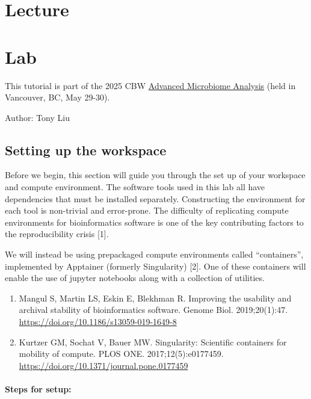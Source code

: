 \documentclass[
]{book}
\providecommand{\tightlist}{%
  \setlength{\itemsep}{0pt}\setlength{\parskip}{0pt}}
\begin{document}
\section{Lecture}\label{lecture-2}

\section{Lab}\label{lab-1}

This tutorial is part of the 2025 CBW \href{https://bioinformaticsdotca.github.io/AMB_2025/}{Advanced Microbiome Analysis} (held in Vancouver, BC, May 29-30).

Author: Tony Liu

\subsection{Setting up the workspace}\label{setting-up-the-workspace}

Before we begin, this section will guide you through the set up of your workspace and compute environment.
The software tools used in this lab all have dependencies that must be installed separately.
Constructing the environment for each tool is non-trivial and error-prone.
The difficulty of replicating compute environments for bioinformatics software is one of the key contributing factors
to the reproducibility crisis {[}1{]}.

We will instead be using prepackaged compute environments called ``containers'', implemented by Apptainer (formerly Singularity) {[}2{]}.
One of these containers will enable the use of jupyter notebooks along with a collection of utilities.

\begin{enumerate}
\def\labelenumi{\arabic{enumi}.}
\tightlist
\item
  Mangul S, Martin LS, Eskin E, Blekhman R. Improving the usability and archival stability of bioinformatics software. Genome Biol. 2019;20(1):47. \url{https://doi.org/10.1186/s13059-019-1649-8}
\item
  Kurtzer GM, Sochat V, Bauer MW. Singularity: Scientific containers for mobility of compute. PLOS ONE. 2017;12(5):e0177459. \url{https://doi.org/10.1371/journal.pone.0177459}
\end{enumerate}

\paragraph{Steps for setup:}\label{steps-for-setup}
\end{document}
